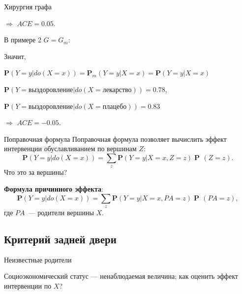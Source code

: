 \documentclass[9pt,pdf,utf8,hyperref={unicode},aspectratio=169]{beamer}
\DeclareMathOperator{\prob}{\mathbf{P}\!}
\newcommand{\condprob}[2] {\mathbf{P}\!\left(#1\left|#2\right.\right)}
\begin{document}
\begin{frame}{Хирургия графа}
{	$\Rightarrow$ $ACE = 0.05$.
	
	\bigskip
	
	В примере 2 $G=G_m$:
\begin{center}
\end{center}
Значит, 

$\condprob{Y =y}{do\left(X = x\right)} = \mathbf{P}_m\!\left(\left.Y=y\right|X=x\right) = \condprob{Y =y}{X = x}$
	
$\condprob{Y =\text{выздоровление}}{do\left(X = \text{лекарство}\right)} = 0.78$, 
	
$\condprob{Y =\text{выздоровление}}{do\left(X = \text{плацебо}\right)} = 0.83$ 
	
$\Rightarrow$ $ACE = -0.05$.
}
\end{frame}


\begin{frame}{Поправочная формула}
Поправочная формула позволяет вычислить эффект интервенции обуславливанием по вершинам $Z$:
$$\condprob{Y =y}{do\left(X = x\right)} = \sum_z \condprob{Y=y}{X=x, Z=z} \prob\left(Z=z\right).$$
Что это за вершины?

\bigskip

\textbf{Формула причинного эффекта}:
$$\condprob{Y =y}{do\left(X = x\right)} = \sum_z \condprob{Y=y}{X=x, PA=z} \prob\left(PA=z\right),$$
где $PA$~--- родители вершины $X$.
\end{frame}

\subsection{Критерий задней двери}
\begin{frame}{Неизвестные родители}
\begin{center}
\end{center}

Социоэкономический статус — ненаблюдаемая величина; как оценить эффект интервенции по $X$?
\end{frame}
\end{document}
